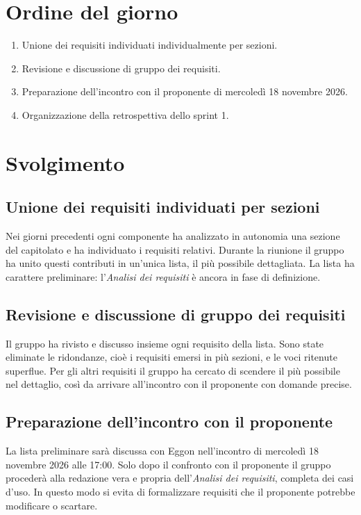 \documentclass[interno]{gpt}
\begin{document}
\section{Ordine del giorno}
\begin{enumerate}
  \item Unione dei requisiti individuati individualmente per sezioni.
  \item Revisione e discussione di gruppo dei requisiti.
  \item Preparazione dell'incontro con il proponente di mercoledì 18 novembre 2026.
  \item Organizzazione della retrospettiva dello sprint 1.
\end{enumerate}

\clearpage

\section{Svolgimento}

\subsection{Unione dei requisiti individuati per sezioni}
Nei giorni precedenti ogni componente ha analizzato in autonomia una sezione del capitolato e ha individuato i requisiti relativi.
Durante la riunione il gruppo ha unito questi contributi in un'unica lista, il più possibile dettagliata.
La lista ha carattere preliminare: l'\textit{Analisi dei requisiti} è ancora in fase di definizione.

\subsection{Revisione e discussione di gruppo dei requisiti}
Il gruppo ha rivisto e discusso insieme ogni requisito della lista.
Sono state eliminate le ridondanze, cioè i requisiti emersi in più sezioni, e le voci ritenute superflue.
Per gli altri requisiti il gruppo ha cercato di scendere il più possibile nel dettaglio, così da arrivare all'incontro con il proponente con domande precise.

\subsection{Preparazione dell'incontro con il proponente}
La lista preliminare sarà discussa con Eggon nell'incontro di mercoledì 18 novembre 2026 alle 17:00.
Solo dopo il confronto con il proponente il gruppo procederà alla redazione vera e propria dell'\textit{Analisi dei requisiti}, completa dei casi d'uso.
In questo modo si evita di formalizzare requisiti che il proponente potrebbe modificare o scartare.
\end{document}
